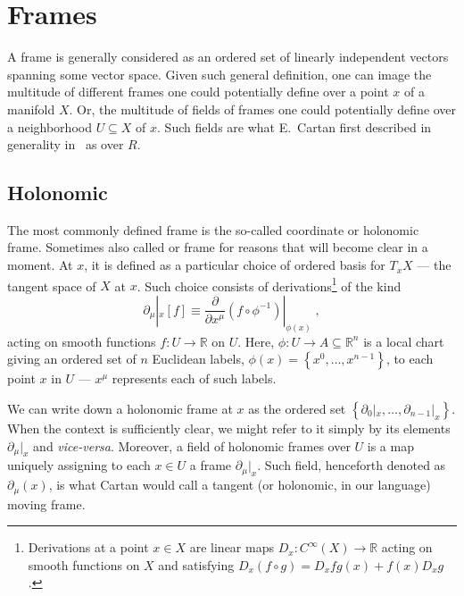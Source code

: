 \documentclass[../../main.tex]{subfiles}
\begin{document}
\section{Frames}\label{sec:holonomic_and_non-holonomic_frames}

A frame is generally considered as an ordered set of linearly independent vectors spanning some vector space. Given such general definition, one can image the multitude of different frames one could potentially define over a point $x$ of a manifold $X$. Or, the multitude of fields of frames one could potentially define over a neighborhood $U\subseteq X$ of $x$. Such fields are what E.~Cartan first described in generality in~\cite{weyl1938} as  over $R$.

\subsection{Holonomic}\label{ssec:holonomic}

The most commonly defined frame is the so-called coordinate or holonomic frame. Sometimes also called  or  frame for reasons that will become clear in a moment. At $x$, it is defined as a particular choice of ordered basis for $T_x X$ --- the tangent space of $X$ at $x$. Such choice consists of derivations\footnote{Derivations at a point $x\in X$ are linear maps $D_x:C^{\infty}\left(X\right)\rightarrow \mathbb{R}$ acting on smooth functions on $X$ and satisfying $D_x \left(f\circ g\right)=D_x f g(x) + f(x)D_x g$.} of the kind
\begin{equation}
  \label{eq:holonomic-basis}
  \partial_\mu|_x \left[f\right] \equiv \frac{\partial}{\partial x^\mu} \left(f\circ\phi^{-1}\right)|_{\phi(x)}\;,
\end{equation}
acting on smooth functions $f: U \rightarrow \mathbb{R}$ on $U$. Here, $ \phi: U \rightarrow A \subseteq \mathbb{R}^n $ is a local chart giving an ordered set of $n$ Euclidean labels, $\phi(x)=\left\{x^0,\ldots,x^{n-1}\right\}$, to each point $x$ in $U$ --- $x^\mu$ represents each of such labels.

We can  write down a holonomic frame at $x$ as the ordered set $\left\{\partial_0|_x, \ldots, \partial_{n-1}|_x\right\}$. When the context is sufficiently clear, we might refer to it simply by its elements $\partial_\mu|_x$ and \textit{vice-versa}. Moreover, a field of holonomic frames over $ U $ is a map uniquely assigning to each $ x \in U $ a frame $ \partial_\mu|_x $. Such field, henceforth denoted as $\partial_\mu \left(x\right)$, is what Cartan would call a tangent (or holonomic, in our language) moving frame.
\end{document}
